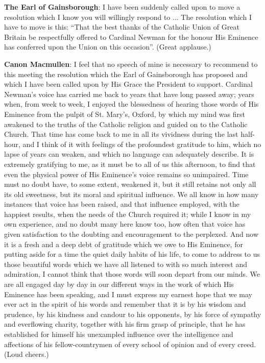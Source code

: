 \textbf{The Earl of Gainsborough}: I
have been suddenly called upon to move a resolution which I know you
will willingly respond to ... The resolution which I have to move is
this: ``That the best thanks of the Catholic Union of Great
Britain be respectfully offered to Cardinal Newman for the honour His
Eminence has conferred upon the Union on this occasion''. (Great
applause.)

\textbf{Canon Macmullen}: I feel that no
speech of mine is necessary to recommend to this meeting the
resolution which the Earl of Gainsborough has proposed and which I
have been called upon by His Grace the President to support. Cardinal
Newman’s voice has carried me back to years that have long passed
away; years when, from week to week, I enjoyed the blessedness of
hearing those words of His Eminence from the pulpit of St. Mary’s,
Oxford, by which my mind was first awakened to the truths of the
Catholic religion and guided on to the Catholic Church. That time has
come back to me in all its vividness during the last half-hour, and I
think of it with feelings of the profoundest gratitude to him, which
no lapse of years can weaken, and which no language can adequately
describe. It is extremely gratifying to me, as it must be to all of us
this afternoon, to find that even the physical power of His Eminence’s
voice remains so unimpaired. Time must no doubt have, to some extent,
weakened it, but it still retains not only all its old sweetness, but
its moral and spiritual influence. We all know in how many instances
that voice has been raised, and that influence employed, with the
happiest results, when the needs of the Church required it; while I
know in my own experience, and no doubt many here know too, how often
that voice has given satisfaction to the doubting and encouragement to
the perplexed. And now it is a fresh and a deep debt of gratitude
which we owe to His Eminence, for putting aside for a time the
quiet daily habits of his life, to come to address to us those
beautiful words which we have all listened to with so much interest
and admiration, I cannot think that those words will soon depart from
our minds. We are all engaged day by day in our different ways in the
work of which His Eminence has been speaking, and I must express my
earnest hope that we may ever act in the spirit of his words and
remember that it is by his wisdom and prudence, by his kindness and
candour to his opponents, by his force of sympathy and everflowing
charity, together with his firm grasp of principle, that he has
established for himself his unexampled influence over the intelligence
and affections of his fellow-countrymen of every school of opinion and
of every creed. (Loud cheers.)

